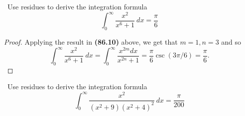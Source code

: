 \documentclass[11pt]{amsart}
\theoremstyle{definition}
\numberwithin{theorem}{section}
\numberwithin{definition}{section}
\numberwithin{equation}{section}
\begin{document}
\medskip {}\ Use residues to derive the integration formula
\begin{equation*}
	\int_0^\infty \frac{x^2}{x^6  + 1}\ dx = \frac{\pi}{6}
\end{equation*}
\begin{proof}
	Applying the result in \textbf{(86.10)} above, we get that $m = 1, n =3$ and so
	\begin{equation*}
	\int_0^\infty \frac{x^2}{x^6  + 1}\ dx = \int_0^\infty \frac{x^{2m}dx}{x^{2n} + 1} = \frac{\pi}{6} \csc({3}\pi/{6}) = \frac{\pi}{6}.
	\end{equation*}
\end{proof}
\medskip {}\ Use residues to derive the integration formula
\begin{equation*}
	\int_0^\infty \frac{x^2}{(x^2 + 9)(x^2 + 4)^2}\ dx = \frac{\pi}{200}
\end{equation*}
\end{document}
